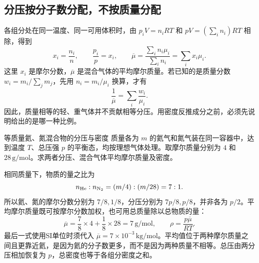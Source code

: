 \subsection{分压按分子数分配，不按质量分配}
各组分处在同一温度、同一可用体积时，由 $p_iV=n_iRT$ 和 $pV=(\sum_i n_i)RT$ 相除，得到
\[
 x_i=\frac{n_i}{n},\qquad \frac{p_i}{p}=x_i,\qquad
 \overline\mu=\frac{\sum_i n_i\mu_i}{\sum_i n_i}=\sum_i x_i\mu_i.
\]
这里 $x_i$ 是摩尔分数，$\overline\mu$ 是混合气体的平均摩尔质量。若已知的是质量分数 $w_i=m_i/\sum_jm_j$，先用 $n_i=m_i/\mu_i$ 换算，才有
\[
 \frac1{\overline\mu}=\sum_i\frac{w_i}{\mu_i}.
\]
因此，质量相等的轻、重气体并不贡献相等分压。用密度反推成分之前，必须先说明给出的是哪一种比例。

\begin{origexamplebox}{等质量氦、氮混合物的分压与密度}\label{ch14:ex:teaching-mixture}
质量各为 $m$ 的氦气和氮气装在同一容器中，达到温度 $T$、总压强 $p$ 的平衡态，均按理想气体处理。取摩尔质量分别为 $4$ 和 $28\,\mathrm{g/mol}$。求两者分压、混合气体平均摩尔质量及密度。
\end{origexamplebox}
\begin{xesolution}
相同质量下，物质的量之比为
\[
 n_{\rm He}:n_{\rm N_2}=(m/4):(m/28)=7:1.
\]
所以氦、氮的摩尔分数分别为 $7/8,1/8$，分压分别为 $7p/8,p/8$，并非各为 $p/2$。平均摩尔质量既可按摩尔分数加权，也可用总质量除以总物质的量：
\[
 \overline\mu=\frac78\times4+\frac18\times28
 =7\,\mathrm{g/mol},\qquad
 \rho=\frac{p\overline\mu}{RT}.
\]
最后一式使用SI单位时须代入 $\overline\mu=7\times10^{-3}\,\mathrm{kg/mol}$。平均值位于两种摩尔质量之间且更靠近氦，是因为氦的分子数更多，而不是因为两种质量不相等。总压由两分压相加恢复为 $p$，总密度也等于各组分密度之和。
\end{xesolution}
